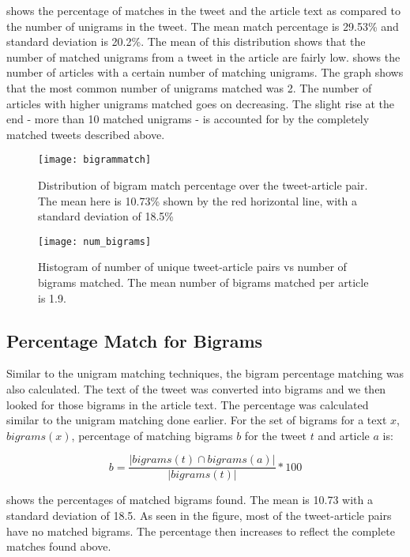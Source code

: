  shows the percentage of matches in the tweet and the article text as compared to the number of unigrams in the tweet. The mean match percentage is 29.53\% and standard deviation is 20.2\%. The mean of this distribution shows that the number of matched unigrams from a tweet in the article are fairly low.  shows the number of articles with a certain number of matching unigrams. The graph shows that the most common number of unigrams matched was 2. The number of articles with higher unigrams matched goes on decreasing. The slight rise at the end - more than 10 matched unigrams - is accounted for by the completely matched tweets described above.

\begin{figure}[tbp]
\centering
\texttt{[image: bigrammatch]}
\caption{Distribution of bigram match percentage over the tweet-article pair. The mean here is 10.73\% shown by the red horizontal line, with a standard deviation of 18.5\%}
\label{fig:bigrammatch}
\end{figure}

\begin{figure}[tbp]
\centering
\texttt{[image: num\_bigrams]}
\caption{Histogram of number of unique tweet-article pairs vs number of bigrams matched. The mean number of bigrams matched per article is 1.9.}
\label{fig:num_bigrams}
\end{figure}


\subsection{Percentage Match for Bigrams}
\label{sec:bigrams}

Similar to the unigram matching techniques, the bigram percentage matching was also calculated. The text of the tweet was converted into bigrams and we then looked for those bigrams in the article text. The percentage was calculated similar to the unigram matching done earlier. For the set of bigrams for a text $x$, $\textit{bigrams}(x)$, percentage of matching bigrams $b$ for the tweet $t$ and article $a$ is: 

\begin{equation}
b = \frac{| bigrams(t) \cap bigrams(a) |}{| bigrams(t) |} * 100
\end{equation}

 shows the percentages of matched bigrams found. The mean is 10.73 with a standard deviation of 18.5. As seen in the figure, most of the tweet-article pairs have no matched bigrams. The percentage then increases to reflect the complete matches found above.

